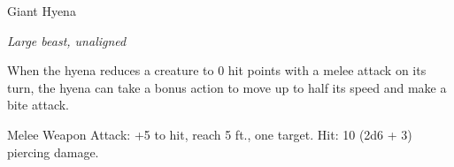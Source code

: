 \begin{monsterbox}{Giant Hyena}
\begin{hangingpar}
\textit{Large beast, unaligned}
\end{hangingpar}
\dndline%
\basics[%
armorclass = 12,
hitpoints = 6d10 + 12,
speed = {50 ft.}
]
\dndline%
\stats[%
STR = \stat{16},
DEX = \stat{14},
CON = \stat{14},
INT = \stat{2},
WIS = \stat{12},
CHA = \stat{7}
]
\dndline%
\details[%
skills={Perception +3, },
damageimmunities={},
savingthrows={},
conditionimmunities={},
damageresistances={},
damagevulnerabilities={},
senses={passive Perception 13},
challenge=1
]
\dndline%
\begin{monsteraction}[Rampage]
When the hyena reduces a creature to 0 hit points with a melee attack on its turn, the hyena can take a bonus action to move up to half its speed and make a bite attack.
\end{monsteraction}
\begin{monsteraction}[Bite]
Melee Weapon Attack: +5 to hit, reach 5 ft., one target. Hit: 10 (2d6 + 3) piercing damage.
\end{monsteraction}
\end{monsterbox}